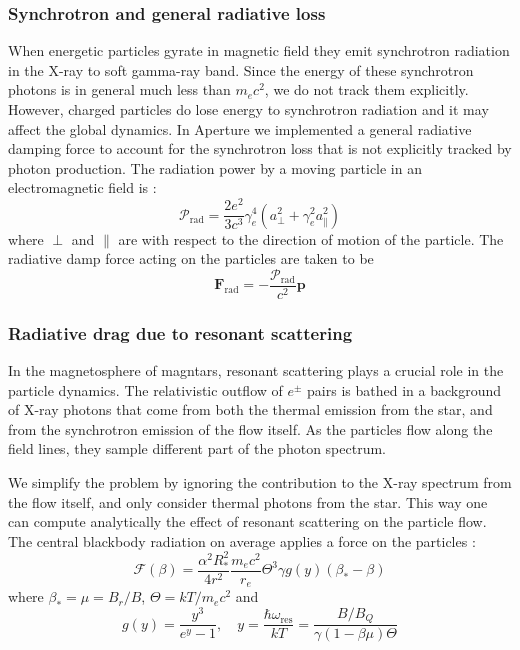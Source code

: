 \subsubsection{Synchrotron and general radiative loss}
\label{sec:synchrotron-loss}

When energetic particles gyrate in magnetic field they emit synchrotron
radiation in the X-ray to soft gamma-ray band. Since the energy of these
synchrotron photons is in general much less than $m_{e}c^{2}$, we do not track
them explicitly. However, charged particles do lose energy to synchrotron
radiation and it may affect the global dynamics. In Aperture we implemented a
general radiative damping force to account for the synchrotron loss that is not
explicitly tracked by photon production. The radiation power by a moving
particle in an electromagnetic field is \citep[e.g.][]{cerutti_extreme_2012}:
\begin{equation}
  \label{eq:rad-power}
  \mathcal{P}_\mathrm{rad} = \frac{2e^2}{3c^3}\gamma_{e}^{4}(a_{\perp}^2+\gamma_{e}^2a_{\parallel}^2)
\end{equation}
where $\perp$ and $\parallel$ are with respect to the direction of motion of the
particle. The radiative damp force acting on the particles are taken to be
\begin{equation}
  \label{eq:rad-force}
  \mathbf{F}_\mathrm{rad} = -\frac{\mathcal{P}_\mathrm{rad}}{c^2}\mathbf{p}
\end{equation}


\subsubsection{Radiative drag due to resonant scattering}
\label{sec:resonant-scattering}

In the magnetosphere of magntars, resonant scattering plays a crucial role in
the particle dynamics. The
relativistic outflow of $e^{\pm}$ pairs is bathed in a background of X-ray
photons that come from both the thermal emission from the star, and from the
synchrotron emission of the flow itself. As the particles flow along the field
lines, they sample different part of the photon spectrum.

We simplify the problem by ignoring the contribution to the X-ray spectrum from
the flow itself, and only consider thermal photons from the star. This way one
can compute analytically the effect of resonant scattering on the particle flow.
The central blackbody radiation on average applies a force on the particles
\citep{beloborodov_electron-positron_2012}:
\begin{equation}
  \label{eq:resonant-drag}
  \mathcal{F}(\beta) = \frac{\alpha^2R_{*}^2}{4r^2}\frac{m_{e}c^2}{r_{e}}\Theta^3\gamma g(y)(\beta_{*}-\beta)
\end{equation}
where $\beta_{*} = \mu = B_r/B$, $\Theta = kT/m_{e}c^2$ and
\begin{equation}
  \label{eq:y-and-gy}
  g(y) = \frac{y^3}{e^y - 1},\quad y = \frac{\hbar\omega_\mathrm{res}}{kT} = \frac{B/B_Q}{\gamma(1 - \beta\mu)\Theta}
\end{equation}

